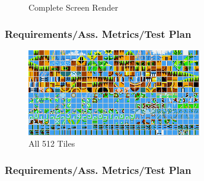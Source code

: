 \documentclass{beamer}
\begin{document}
\begin{frame}
\begin{figure}[H]
\begin{minipage}[H]{0.45\linewidth}
            \caption{Complete Screen Render}
            \label{fig:screen}
        \end{minipage}
    \end{figure}
\end{frame}

\begin{frame}
    \frametitle{Requirements/Ass. Metrics/Test Plan}
    \begin{figure}[H]
        \centering
        \begin{minipage}[H]{0.8\linewidth}
            \centering
            \includegraphics[width=\textwidth]{../images/tiles.png}
            \caption{All 512 Tiles}
            \label{fig:tiles}
        \end{minipage}
    \end{figure}
    \vfill
\end{frame}

\begin{frame}
    \frametitle{Requirements/Ass. Metrics/Test Plan}
\end{frame}
\end{document}
